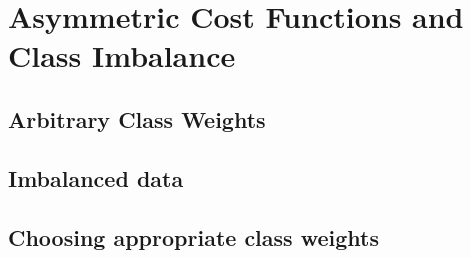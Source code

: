 \documentclass[11pt, answers]{exam}
\begin{document}
  \section{Asymmetric Cost Functions and Class Imbalance}%
  \label{sec:asymmetric_cost_functions_and_class_imbalance}

  \subsection{Arbitrary Class Weights}%
  \label{sub:arbitrary_class_weights}

  \begin{solution}\begin{parts}
    \part
    \part
    \part
  \end{parts}\end{solution}

  \subsection{Imbalanced data}%
  \label{sub:imbalanced_data}

  \begin{solution}\begin{parts}
    \part
    \part
  \end{parts}\end{solution}

  \subsection{Choosing appropriate class weights}%
  \label{sub:choosing_appropriate_class_weights}

  \begin{solution}\begin{parts}
    \part
    \part
  \end{parts}\end{solution}
\end{document}
